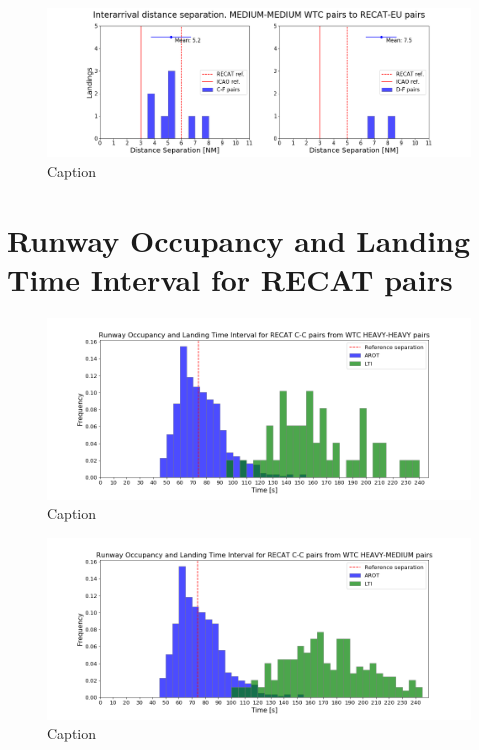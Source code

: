 \begin{figure}[h]
    \centering
    \includegraphics[width=1\textwidth]{graphics/fig_MM_to_CF_and_DF_pairs_dist_separ.png}
    \caption[list of figures caption]{Caption}
    \label{fig:MM_to_CF_and_DF_pairs_dist_separ}
\end{figure}


\section{Runway Occupancy and Landing Time Interval for RECAT pairs}




\begin{figure}[h]
    \centering
    \includegraphics[width=1\textwidth]{graphics/fig_CC_from_HH_pairs_time_sep.png}
    \caption[list of figures caption]{Caption}
    \label{fig:CC_from_HH_pairs_time_sep}
\end{figure}




\begin{figure}[h]
    \centering
    \includegraphics[width=1\textwidth]{graphics/fig_CC_from_HM_pairs_time_sep.png}
    \caption[list of figures caption]{Caption}
    \label{fig:CC_from_HM_pairs_time_sep}
\end{figure}

